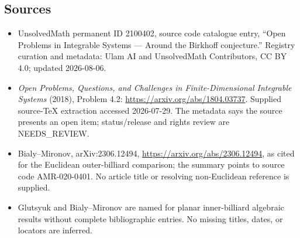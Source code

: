 \documentclass[11pt]{article}
\begin{document}
\subsection{Sources}
\begin{itemize}
\item UnsolvedMath permanent ID 2100402, source code catalogue entry, ``Open Problems in Integrable Systems --- Around the Birkhoff conjecture.'' Registry curation and metadata: Ulam AI and UnsolvedMath Contributors, CC BY 4.0; updated 2026-08-06.
\item \emph{Open Problems, Questions, and Challenges in Finite-Dimensional Integrable Systems} (2018), Problem 4.2: \url{https://arxiv.org/abs/1804.03737}. Supplied source-TeX extraction accessed 2026-07-29. The metadata says the source presents an open item; status/release and rights review are NEEDS\_REVIEW.
\item Bialy--Mironov, arXiv:2306.12494, \url{https://arxiv.org/abs/2306.12494}, as cited for the Euclidean outer-billiard comparison; the summary points to source code AMR-020-0401. No article title or resolving non-Euclidean reference is supplied.
\item Glutsyuk and Bialy--Mironov are named for planar inner-billiard algebraic results without complete bibliographic entries. No missing titles, dates, or locators are inferred.
\end{itemize}
\end{document}
